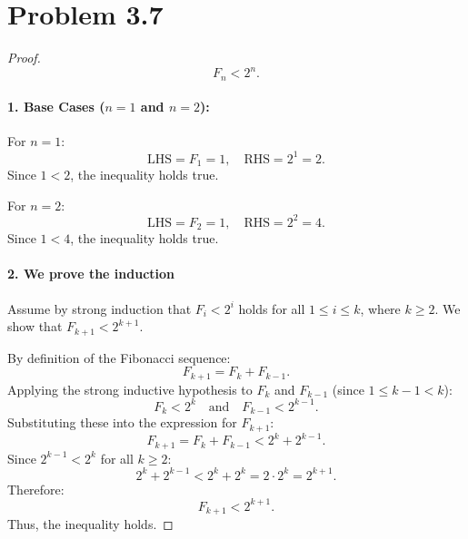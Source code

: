\documentclass[12pt]{article}
\begin{document}
\section*{Problem 3.7}
\begin{proof}
    \[
F_n < 2^n.
\]
\paragraph{1. Base Cases ($n = 1$ and $n = 2$):}
For $n = 1$:
\[
\text{LHS} = F_1 = 1, \quad \text{RHS} = 2^1 = 2.
\]
Since $1 < 2$, the inequality holds true.

\vspace{0.5em}
\noindent For $n = 2$:
\[
\text{LHS} = F_2 = 1, \quad \text{RHS} = 2^2 = 4.
\]
Since $1 < 4$, the inequality holds true.

\paragraph{2. We prove the induction}
Assume by strong induction that $F_i < 2^i$ holds for all $1 \le i \le k$, where $k \ge 2$. We show that $F_{k+1} < 2^{k+1}$.

By definition of the Fibonacci sequence:
\[
F_{k+1} = F_k + F_{k-1}.
\]
Applying the strong inductive hypothesis to $F_k$ and $F_{k-1}$ (since $1 \le k-1 < k$):
\[
F_k < 2^k \quad \text{and} \quad F_{k-1} < 2^{k-1}.
\]
Substituting these into the expression for $F_{k+1}$:
\[
F_{k+1} = F_k + F_{k-1} < 2^k + 2^{k-1}.
\]
Since $2^{k-1} < 2^k$ for all $k \ge 2$:
\[
2^k + 2^{k-1} < 2^k + 2^k = 2 \cdot 2^k = 2^{k+1}.
\]
Therefore:
\[
F_{k+1} < 2^{k+1}.
\]
Thus, the inequality holds.
\end{proof}
\end{document}
